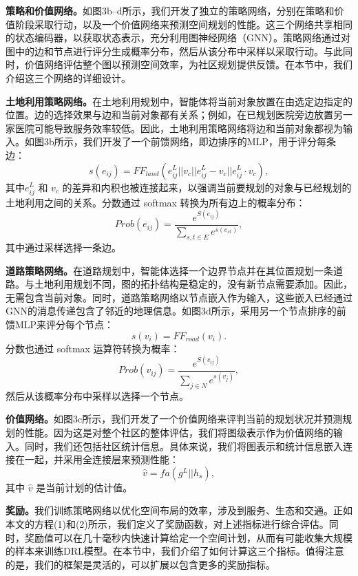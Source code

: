 \textbf{策略和价值网络。}如图3b–d所示，我们开发了独立的策略网络，分别在策略和价值阶段采取行动，以及一个价值网络来预测空间规划的性能。这三个网络共享相同的状态编码器，以获取状态表示，充分利用图神经网络（GNN）。策略网络通过对图中的边和节点进行评分生成概率分布，然后从该分布中采样以采取行动。与此同时，价值网络评估整个图以预测空间效率，为社区规划提供反馈。在本节中，我们介绍这三个网络的详细设计。

\textbf{土地利用策略网络。}在土地利用规划中，智能体将当前对象放置在由选定边指定的位置。边的选择效果与边和当前对象都有关系；例如，在已规划医院旁边放置另一家医院可能导致服务效率较低。因此，土地利用策略网络将边和当前对象都视为输入。如图3b所示，我们开发了一个前馈网络，即边排序的MLP，用于评分每条边：
\begin{equation}
    s(e_{ij})=FF_{land}(e_{ij}^L||v_c||e_{ij}^L-v_c||e_{ij}^L·v_c),
\end{equation}
其中$e^L_{ij}$ 和 $v_c$ 的差异和内积也被连接起来，以强调当前要规划的对象与已经规划的土地利用之间的关系。分数通过 softmax 转换为所有边上的概率分布：
\begin{equation}
    Prob(e_{ij})=\frac{e^{S(e_{ij})}}{\sum_{s,t\in E}e^{s(e_{st})}},
\end{equation}
其中通过采样选择一条边。

\textbf{道路策略网络。}在道路规划中，智能体选择一个边界节点并在其位置规划一条道路。与土地利用规划不同，图的拓扑结构是稳定的，没有新节点需要添加。因此，无需包含当前对象。同时，道路策略网络以节点嵌入作为输入，这些嵌入已经通过GNN的消息传递包含了邻近的地理信息。如图3d所示，采用另一个节点排序的前馈MLP来评分每个节点：
\begin{equation}
    s(v_i) = FF_{road}(v_i).
\end{equation}
分数也通过 softmax 运算符转换为概率：
\begin{equation}
    Prob(v_{ij})=\frac{e^{S(v_{ij})}}{\sum_{j\in N}e^{s(v_{j})}},
\end{equation}
然后从该概率分布中采样以选择一个节点。

\textbf{价值网络。}如图3c所示，我们开发了一个价值网络来评判当前的规划状况并预测规划的性能。因为这是对整个社区的整体评估，我们将图级表示作为价值网络的输入。同时，我们还包括社区统计信息。具体来说，我们将图表示和统计信息嵌入连接在一起，并采用全连接层来预测性能：
\begin{equation}
    \hat{v} = fa(g^L||h_s),
\end{equation}
其中 $\hat{v}$ 是当前计划的估计值。

\textbf{奖励。}我们训练策略网络以优化空间布局的效率，涉及到服务、生态和交通。正如本文的方程(1)和(2)所示，我们定义了奖励函数，对上述指标进行综合评估。同时，奖励值可以在几十毫秒内快速计算给定一个空间计划，从而有可能收集大规模的样本来训练DRL模型。在本节中，我们介绍了如何计算这三个指标。值得注意的是，我们的框架是灵活的，可以扩展以包含更多的奖励指标。

